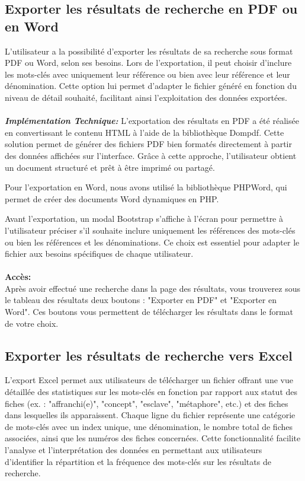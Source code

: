 \documentclass[12pt]{article}
\begin{document}
    \subsection{Exporter les résultats de recherche en PDF ou en Word}
    L'utilisateur a la possibilité d'exporter les résultats de sa recherche sous format PDF ou Word, selon ses besoins. Lors de l’exportation, il peut choisir d'inclure les mots-clés avec uniquement leur référence ou bien avec leur référence et leur dénomination. Cette option lui permet d'adapter le fichier généré en fonction du niveau de détail souhaité, facilitant ainsi l’exploitation des données exportées.
    \\
    \\
    \textit{\textbf{Implémentation Technique:}}
    L'exportation des résultats en PDF a été réalisée en convertissant le contenu HTML à l'aide de la bibliothèque Dompdf. Cette solution permet de générer des fichiers PDF bien formatés directement à partir des données affichées sur l’interface. Grâce à cette approche, l’utilisateur obtient un document structuré et prêt à être imprimé ou partagé.

    Pour l'exportation en Word, nous avons utilisé la bibliothèque PHPWord, qui permet de créer des documents Word dynamiques en PHP.

    Avant l’exportation, un modal Bootstrap s’affiche à l’écran pour permettre à l’utilisateur préciser s’il souhaite inclure uniquement les références des mots-clés ou bien les références et les dénominations. Ce choix est essentiel pour adapter le fichier aux besoins spécifiques de chaque utilisateur.
    \\
    \\
    \textbf{Accès: } \\
    Après avoir effectué une recherche dans la page des résultats, vous trouverez sous le tableau des résultats deux boutons : "Exporter en PDF" et "Exporter en Word". Ces boutons vous permettent de télécharger les résultats dans le format de votre choix.

    \subsection{Exporter les résultats de recherche vers Excel}
    L'export Excel permet aux utilisateurs de télécharger un fichier offrant une vue détaillée des statistiques sur les mots-clés en fonction par rapport aux statut des fiches (ex. : "affranchi(e)", "concept", "esclave", "métaphore", etc.) et des fiches dans lesquelles ils apparaissent. Chaque ligne du fichier représente une catégorie de mots-clés avec un index unique, une dénomination, le nombre total de fiches associées, ainsi que les numéros des fiches concernées. Cette fonctionnalité facilite l’analyse et l’interprétation des données en permettant aux utilisateurs d'identifier la répartition et la fréquence des mots-clés sur les résultats de recherche.
\end{document}
